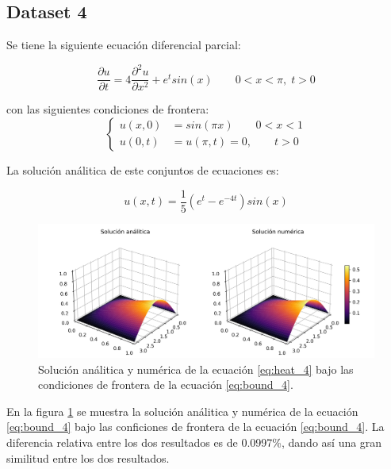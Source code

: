 \subsection{Dataset 4}

Se tiene la siguiente ecuación diferencial parcial:

\begin{equation}
    \frac{\partial u}{\partial t} = 4\frac{\partial^2 u}{\partial x^2}+e^tsin(x)\qquad 0<x<\pi, \; t>0 \label{eq:heat_4}
\end{equation}

con las siguientes condiciones de frontera:
\begin{equation}
    \begin{cases}
        u(x,0) & = sin(\pi x) \qquad 0<x<1 \\
        u(0,t) & =u(\pi,t) = 0, \qquad t>0
    \end{cases} \label{eq:bound_4}
\end{equation}

La solución análitica de este conjuntos de ecuaciones es:

\begin{equation}
    u(x,t)=\frac{1}{5}( e^t-e^{-4t})sin(x) \label{eq:sol_4}
\end{equation}


\begin{figure}[H]
    \centering
    \includegraphics[width=17cm]{Graphics/surface_4.png}
    \caption{Solución análitica y numérica de la ecuación \ref{eq:heat_4} bajo las condiciones de frontera de la ecuación \ref{eq:bound_4}.}
    \label{fig:sol_4}
\end{figure}

En la figura \ref{fig:sol_4} se muestra la solución análitica y numérica de la ecuación \ref{eq:bound_4} bajo las conficiones de frontera de la ecuación \ref{eq:bound_4}. La diferencia relativa entre los dos resultados es de 0.0997\%, dando así una gran similitud entre los dos resultados.